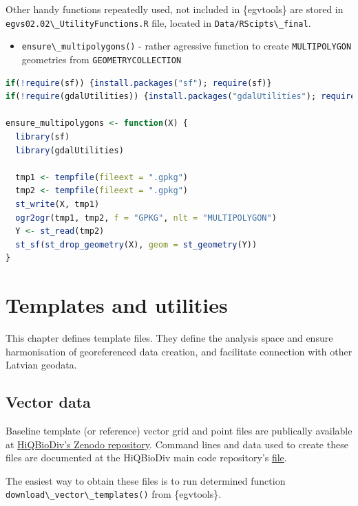 \documentclass[
]{book}
\newcommand{\passthrough}[1]{#1}
\providecommand{\tightlist}{%
  \setlength{\itemsep}{0pt}\setlength{\parskip}{0pt}}
\begin{document}
Other handy functions repeatedly used, not included in \{egvtools\} are stored
in \passthrough{\lstinline!egvs02.02\_UtilityFunctions.R!} file, located in \passthrough{\lstinline!Data/RScipts\_final!}.

\begin{itemize}
\tightlist
\item
  \passthrough{\lstinline!ensure\_multipolygons()!} - rather agressive function to
  create \passthrough{\lstinline!MULTIPOLYGON!} geometries from \passthrough{\lstinline!GEOMETRYCOLLECTION!}
\end{itemize}

\begin{lstlisting}[language=R]
if(!require(sf)) {install.packages("sf"); require(sf)}
if(!require(gdalUtilities)) {install.packages("gdalUtilities"); require(gdalUtilities)}

ensure_multipolygons <- function(X) {
  library(sf)
  library(gdalUtilities)
  
  tmp1 <- tempfile(fileext = ".gpkg")
  tmp2 <- tempfile(fileext = ".gpkg")
  st_write(X, tmp1)
  ogr2ogr(tmp1, tmp2, f = "GPKG", nlt = "MULTIPOLYGON")
  Y <- st_read(tmp2)
  st_sf(st_drop_geometry(X), geom = st_geometry(Y))
}
\end{lstlisting}

\chapter{Templates and utilities}\label{Ch03}

This chapter defines template files. They define the analysis space and ensure
harmonisation of georeferenced data creation, and facilitate connection with
other Latvian geodata.

\section{Vector data}\label{Ch03.01}

Baseline template (or reference) vector grid and point files are publically available
at \href{https://zenodo.org/records/14277114}{HiQBioDiv's Zenodo repository}. Command lines
and data used to create these files are documented at
the HiQBioDiv main code repository's \href{https://github.com/aavotins/HiQBioDiv/blob/main/Templates/TemplateGrids_Vector.R}{file}.

The easiest way to obtain these files is to run determined
function \passthrough{\lstinline!download\_vector\_templates()!} from \{egvtools\}.
\end{document}
